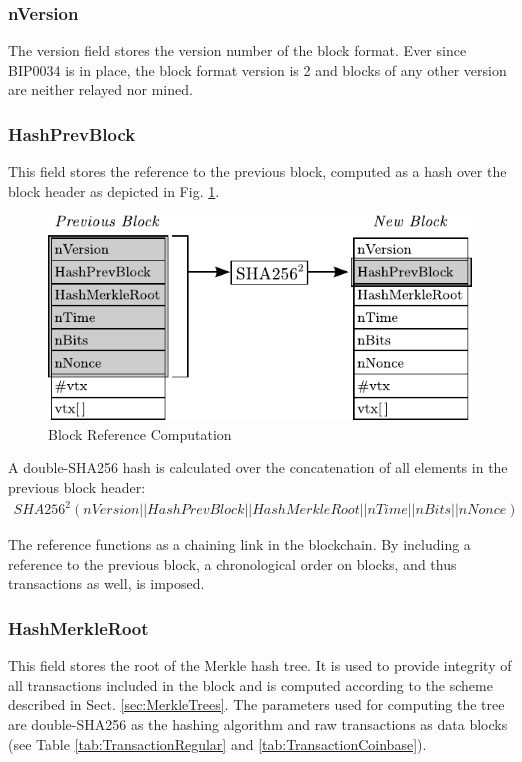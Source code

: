 \vspace{-30pt}
\clearpage

\subsubsection*{nVersion}
The version field stores the version number of the block format. Ever since BIP0034 \cite{BIP0034} is in place, the block format version is 2 and blocks of any other version are neither relayed nor mined.

\subsubsection*{HashPrevBlock}
This field stores the reference to the previous block, computed as a hash over the block header as depicted in Fig. \ref{fig:HashPrevBlock}.
\begin{figure}[ht!]
 \centering
 \includegraphics[scale=0.9]{images/HashPrevBlock.pdf}
 \caption{Block Reference Computation} \label{fig:HashPrevBlock}
\end{figure}

\noindent
A double-SHA256 hash is calculated over the concatenation of all elements in the previous block header:
\begin{equation}
\begin{aligned}
SHA256^{2}(nVersion||HashPrevBlock||HashMerkleRoot||nTime||nBits||nNonce)
\label{eqn:HashPrevBlock}
\end{aligned}
\end{equation}

\noindent
The reference functions as a chaining link in the blockchain. By including a reference to the previous block, a chronological order on blocks, and thus transactions as well, is imposed.


\subsubsection*{HashMerkleRoot}
This field stores the root of the Merkle hash tree. It is used to provide integrity of all transactions included in the block and is computed according to the scheme described in Sect. \ref{sec:MerkleTrees}. The parameters used for computing the tree are double-SHA256 as the hashing algorithm and raw transactions as data blocks (see Table \ref{tab:TransactionRegular} and \ref{tab:TransactionCoinbase}).


